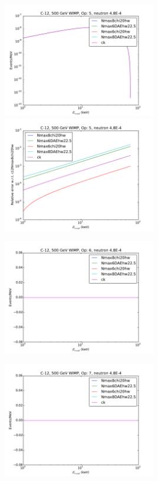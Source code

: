 \documentclass{article}
\begin{document}
\includegraphics[width=0.5\textwidth]{c12-o5}
\includegraphics[width=0.5\textwidth]{c12-o5-relerr}

\includegraphics[width=0.5\textwidth]{c12-o6}

\includegraphics[width=0.5\textwidth]{c12-o7}
\end{document}
